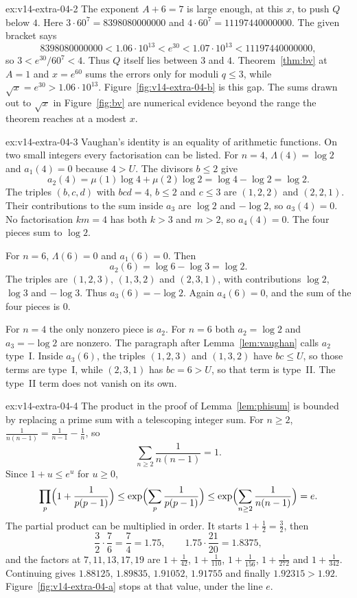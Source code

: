 \begin{solution}{ex:v14-extra-04-2}
\idea The exponent $A+6=7$ is large enough, at this $x$, to push $Q$ below $4$.
\writeup Here $3\cdot60^7=8398080000000$ and $4\cdot60^7=11197440000000$. The given bracket says
\[
8398080000000<1.06\cdot10^{13}<e^{30}<1.07\cdot10^{13}<11197440000000,
\]
so $3<e^{30}/60^7<4$. Thus $Q$ itself lies between $3$ and $4$. Theorem~\ref{thm:bv} at $A=1$ and $x=e^{60}$ sums the errors only for moduli $q\le3$, while $\sqrt x=e^{30}>1.06\cdot10^{13}$. Figure~\ref{fig:v14-extra-04-b} is this gap. The sums drawn out to $\sqrt x$ in Figure~\ref{fig:bv} are numerical evidence beyond the range the theorem reaches at a modest $x$.
\end{solution}

\begin{solution}{ex:v14-extra-04-3}
\idea Vaughan's identity is an equality of arithmetic functions. On two small integers every factorisation can be listed.
\writeup For $n=4$, $\Lambda(4)=\log2$ and $a_1(4)=0$ because $4>U$. The divisors $b\le2$ give
\[
a_2(4)=\mu(1)\log4+\mu(2)\log2=\log4-\log2=\log2.
\]
The triples $(b,c,d)$ with $bcd=4$, $b\le2$ and $c\le3$ are $(1,2,2)$ and $(2,2,1)$. Their contributions to the sum inside $a_3$ are $\log2$ and $-\log2$, so $a_3(4)=0$. No factorisation $km=4$ has both $k>3$ and $m>2$, so $a_4(4)=0$. The four pieces sum to $\log2$.

For $n=6$, $\Lambda(6)=0$ and $a_1(6)=0$. Then
\[
a_2(6)=\log6-\log3=\log2.
\]
The triples are $(1,2,3)$, $(1,3,2)$ and $(2,3,1)$, with contributions $\log2$, $\log3$ and $-\log3$. Thus $a_3(6)=-\log2$. Again $a_4(6)=0$, and the sum of the four pieces is $0$.

For $n=4$ the only nonzero piece is $a_2$. For $n=6$ both $a_2=\log2$ and $a_3=-\log2$ are nonzero. The paragraph after Lemma~\ref{lem:vaughan} calls $a_2$ type~I. Inside $a_3(6)$, the triples $(1,2,3)$ and $(1,3,2)$ have $bc\le U$, so those terms are type~I, while $(2,3,1)$ has $bc=6>U$, so that term is type~II. The type~II term does not vanish on its own.
\end{solution}

\begin{solution}{ex:v14-extra-04-4}
\idea The product in the proof of Lemma~\ref{lem:phisum} is bounded by replacing a prime sum with a telescoping integer sum.
\writeup For $n\ge2$, $\frac1{n(n-1)}=\frac1{n-1}-\frac1n$, so
\[
\sum_{n\ge2}\frac1{n(n-1)}=1.
\]
Since $1+u\le e^u$ for $u\ge0$,
\[
\prod_p\Bigl(1+\frac1{p(p-1)}\Bigr)\le\exp\Bigl(\sum_p\frac1{p(p-1)}\Bigr)\le\exp\Bigl(\sum_{n\ge2}\frac1{n(n-1)}\Bigr)=e.
\]
The partial product can be multiplied in order. It starts $1+\frac12=\frac32$, then
\[
\frac32\cdot\frac76=\frac74=1.75,\qquad 1.75\cdot\frac{21}{20}=1.8375,
\]
and the factors at $7,11,13,17,19$ are $1+\frac1{42}$, $1+\frac1{110}$, $1+\frac1{156}$, $1+\frac1{272}$ and $1+\frac1{342}$. Continuing gives $1.88125$, $1.89835$, $1.91052$, $1.91755$ and finally $1.92315>1.92$. Figure~\ref{fig:v14-extra-04-a} stops at that value, under the line $e$.
\end{solution}

